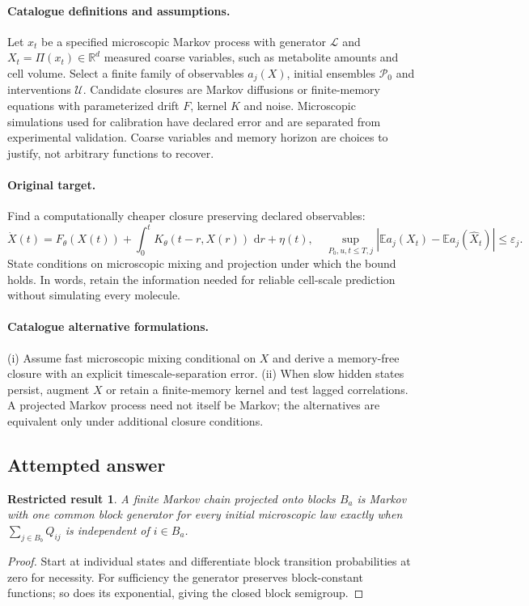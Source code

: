 \documentclass[11pt]{article}
\newcommand{\R}{\mathbb R}
\newcommand{\E}{\mathbb E}
\newcommand{\dd}{\,\mathrm d}
\providecommand{\R}{\mathbb R}
\providecommand{\E}{\mathbb E}
\newtheorem{attemptresult}{Restricted result}[section]
\begin{document}
\paragraph{Catalogue definitions and assumptions.}
Let $x_t$ be a specified microscopic Markov process with generator $\mathcal L$ and $X_t=\Pi(x_t)\in\R^d$ measured coarse variables, such as metabolite amounts and cell volume. Select a finite family of observables $a_j(X)$, initial ensembles $\mathcal P_0$ and interventions $\mathcal U$. Candidate closures are Markov diffusions or finite-memory equations with parameterized drift $F$, kernel $K$ and noise. Microscopic simulations used for calibration have declared error and are separated from experimental validation. Coarse variables and memory horizon are choices to justify, not arbitrary functions to recover.
\paragraph{Original target.}
Find a computationally cheaper closure preserving declared observables:
\[
\dot X(t)=F_\theta(X(t))+\int_0^tK_\theta(t-r,X(r))\,\dd r+\eta(t),
\quad\sup_{P_0,u,t\leq T,j}|\E a_j(X_t)-\E a_j(\widehat X_t)|\leq\varepsilon_j.
\]
State conditions on microscopic mixing and projection under which the bound holds. In words, retain the information needed for reliable cell-scale prediction without simulating every molecule.
\paragraph{Catalogue alternative formulations.}
(i) Assume fast microscopic mixing conditional on $X$ and derive a memory-free closure with an explicit timescale-separation error. (ii) When slow hidden states persist, augment $X$ or retain a finite-memory kernel and test lagged correlations. A projected Markov process need not itself be Markov; the alternatives are equivalent only under additional closure conditions.
\subsection{Attempted answer}
\begin{attemptresult}
A finite Markov chain projected onto blocks $B_a$ is Markov with one common block generator for every initial microscopic law exactly when $\sum_{j\in B_b}Q_{ij}$ is independent of $i\in B_a$.
\end{attemptresult}
\begin{proof}
Start at individual states and differentiate block transition probabilities at zero for necessity. For sufficiency the generator preserves block-constant functions; so does its exponential, giving the closed block semigroup.
\end{proof}
\end{document}
